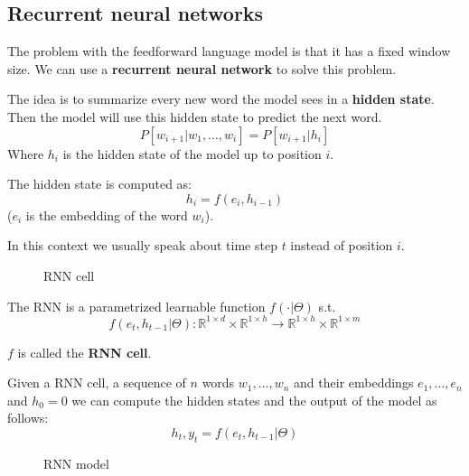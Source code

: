 \subsection{Recurrent neural networks}
\label{sec:recurrent_neural_networks}

The problem with the feedforward language model is that it has a fixed window size.
We can use a \textbf{recurrent neural network} to solve this problem.

The idea is to summarize every new word the model sees in a \textbf{hidden state}.
Then the model will use this hidden state to predict the next word.
\[
    P[w_{i+1}|w_1,\dots,w_i]=P[w_{i+1}|h_i]
\]
Where $h_i$ is the hidden state of the model up to position $i$.

The hidden state is computed as:
\[
    h_i=f(e_i,h_{i-1})
\]
($e_i$ is the embedding of the word $w_i$).

In this context we usually speak about time step $t$ instead of position $i$.

\begin{figure}[H]
    \centering
    \caption{RNN cell}
    \label{fig:rnn_cell}
\end{figure}

The RNN is a parametrized learnable function $f(\cdot|\Theta)$ s.t.
\[
    f(e_t,h_{t-1}|\Theta): \mathbb{R}^{1\times d}\times\mathbb{R}^{1\times h}\rightarrow\mathbb{R}^{1\times h}\times\mathbb{R}^{1\times m}
\]

$f$ is called the \textbf{RNN cell}.

Given a RNN cell, a sequence of $n$ words $w_1,\dots,w_n$ and their embeddings $e_1,\dots,e_n$ and $h_0=0$
we can compute the hidden states and the output of the model as follows:
\[
    h_t,y_t=f(e_t,h_{t-1}|\Theta)
\]

\begin{figure}[H]
    \centering
    \caption{RNN model}
    \label{fig:rnn_model}
\end{figure}


